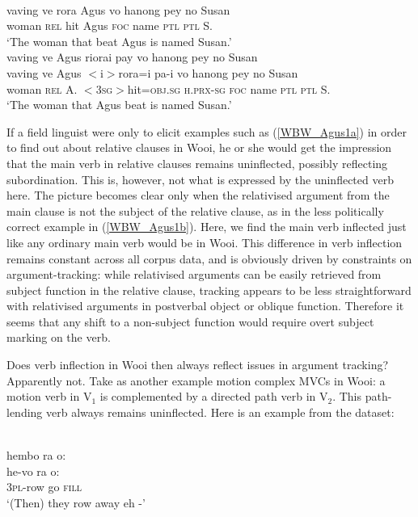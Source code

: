 \ea
{}\\
\ea \label{WBW_Agus1a}
\gll vaving ve rora Agus vo hanong pey no Susan \\
woman \textsc{rel} hit Agus \textsc{foc} name \textsc{ptl} \textsc{ptl} S. \\
\glft `The woman that beat Agus is named Susan.' \\ 
\ex \label{WBW_Agus1b}
\glll vaving ve Agus riorai pay vo hanong pey no Susan \\
vaving ve Agus $<$i$>$rora=i pa-i vo hanong pey no Susan \\
woman \textsc{rel} A. $<$3\textsc{sg}$>$hit=\textsc{obj}.\textsc{sg} \textsc{h}.\textsc{prx}-\textsc{sg} \textsc{foc} name \textsc{ptl} \textsc{ptl} S. \\
\glft `The woman that Agus beat is named Susan.' \\ 
\z
\z

If a field linguist were only to elicit examples such as (\ref{WBW_Agus1a}) in order to find out about relative clauses in Wooi, he or she would get the impression that the main verb in relative clauses remains uninflected, possibly reflecting subordination. This is, however, not what is expressed by the uninflected verb here. The picture becomes clear only when the relativised argument from the main clause is not the subject of the relative clause, as in the less politically correct example in (\ref{WBW_Agus1b}). Here, we find the main verb inflected just like any ordinary main verb would be in Wooi. This difference in verb inflection remains constant across all corpus data, and is obviously driven by constraints on argument-tracking: while relativised arguments can be easily retrieved from subject function in the relative clause, tracking appears to be less straightforward with relativised arguments in postverbal object or oblique function. Therefore it seems that any shift to a non-subject function would require overt subject marking on the verb.

Does verb inflection in Wooi then always reflect issues in argument tracking? Apparently not. Take as another example motion complex MVCs in Wooi: a motion verb in V$_1$ is complemented by a directed path verb in V$_2$. This path-lending verb always remains uninflected. Here is an example from the dataset:

\ea 
{}\\
\glll hembo ra o: \\
he-vo ra o: \\
3\textsc{pl}-row go \textsc{fill} \\
\glft `(Then) they row away eh -'\\ 
\z

